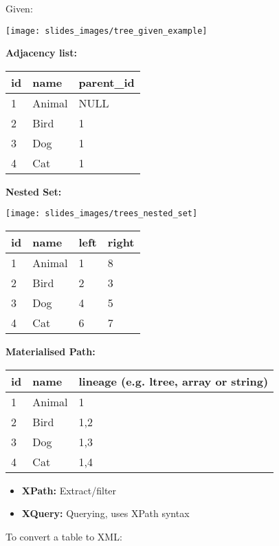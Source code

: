 \begin{breakbox}

Given:
\begin{center}
	\texttt{[image: slides\_images/tree\_given\_example]}
\end{center}

\textbf{Adjacency list:}

\begin{tabular}{lll}
id & name   & parent\_id \\
\hline
1  & Animal & NULL       \\
2  & Bird   & 1          \\
3  & Dog    & 1          \\
4  & Cat    & 1         
\end{tabular}

\textbf{Nested Set:}
\begin{center}
	\texttt{[image: slides\_images/trees\_nested\_set]}
\end{center}

\begin{tabular}{llll}
id & name   & left & right \\
\hline
1  & Animal & 1    & 8     \\
2  & Bird   & 2    & 3     \\
3  & Dog    & 4    & 5     \\
4  & Cat    & 6    & 7    
\end{tabular}

\textbf{Materialised Path:}

\begin{tabular}{lll}
id & name   & lineage (e.g. ltree, array or string) \\
\hline
1  & Animal & 1                    \\
2  & Bird   & 1,2                  \\
3  & Dog    & 1,3                  \\
4  & Cat    & 1,4                 
\end{tabular}
\end{breakbox}

\begin{breakbox}

\begin{itemize}
	\item \textbf{XPath:} Extract/filter
	\item \textbf{XQuery:} Querying, uses XPath syntax
\end{itemize}

To convert a table to XML:

\end{breakbox}

